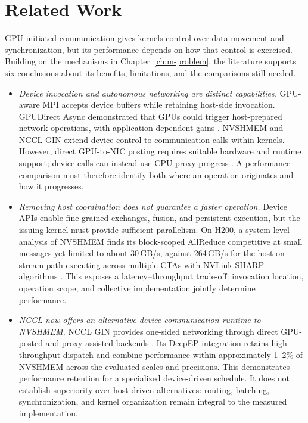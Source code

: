 \chapter{Related Work}\label{ch:m-related}

GPU-initiated communication gives kernels control over data movement and synchronization, but its performance depends on how that control is exercised. Building on the mechanisms in Chapter~\ref{ch:m-problem}, the literature supports six conclusions about its benefits, limitations, and the comparisons still needed.

\begin{itemize}
    \item \emph{Device invocation and autonomous networking are distinct capabilities.}
    GPU-aware MPI accepts device buffers while retaining host-side invocation. GPUDirect Async demonstrated that GPUs could trigger host-prepared network operations, with application-dependent gains \cite{agostini_gpudirect_2018}. NVSHMEM and NCCL GIN extend device control to communication calls within kernels. However, direct GPU-to-NIC posting requires suitable hardware and runtime support; device calls can instead use CPU proxy progress \cite{unat_landscape_2026,hamidouche_kernel-initiated_2026}. A performance comparison must therefore identify both where an operation originates and how it progresses.

    \item \emph{Removing host coordination does not guarantee a faster operation.}
    Device APIs enable fine-grained exchanges, fusion, and persistent execution, but the issuing kernel must provide sufficient parallelism. On H200, a system-level analysis of NVSHMEM finds its block-scoped AllReduce competitive at small messages yet limited to about 30\,GB/s, against 264\,GB/s for the host on-stream path executing across multiple \acp{CTA} with NVLink SHARP algorithms \cite{ma_demystifying_2026}. This exposes a latency--throughput trade-off: invocation location, operation scope, and collective implementation jointly determine performance.

    \item \emph{NCCL now offers an alternative device-communication runtime to NVSHMEM.}
    NCCL GIN provides one-sided networking through direct GPU-posted and proxy-assisted backends \cite{hamidouche_kernel-initiated_2026}. Its DeepEP integration retains high-throughput dispatch and combine performance within approximately 1--2\% of NVSHMEM across the evaluated scales and precisions. This demonstrates performance retention for a specialized device-driven schedule. It does not establish superiority over host-driven alternatives: routing, batching, synchronization, and kernel organization remain integral to the measured implementation.


\end{itemize}
